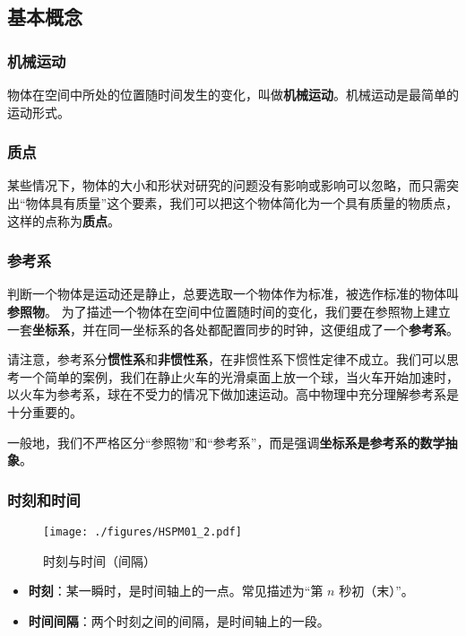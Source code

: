 

\subsection{基本概念}

\subsubsection{机械运动}
物体在空间中所处的位置随时间发生的变化，叫做\textbf{机械运动}。机械运动是最简单的运动形式。

\subsubsection{质点}
某些情况下，物体的大小和形状对研究的问题没有影响或影响可以忽略，而只需突出“物体具有质量”这个要素，我们可以把这个物体简化为一个具有质量的物质点，这样的点称为\textbf{质点}。

\subsubsection{参考系}
判断一个物体是运动还是静止，总要选取一个物体作为标准，被选作标准的物体叫\textbf{参照物}。
为了描述一个物体在空间中位置随时间的变化，我们要在参照物上建立一套\textbf{坐标系}，并在同一坐标系的各处都配置同步的时钟，这便组成了一个\textbf{参考系}。

请注意，参考系分\textbf{惯性系}和\textbf{非惯性系}，在非惯性系下惯性定律不成立。我们可以思考一个简单的案例，我们在静止火车的光滑桌面上放一个球，当火车开始加速时，以火车为参考系，球在不受力的情况下做加速运动。高中物理中充分理解参考系是十分重要的。

一般地，我们不严格区分“参照物”和“参考系”，而是强调\textbf{坐标系是参考系的数学抽象}。

\subsubsection{时刻和时间}
\begin{figure}[ht]
\centering
\texttt{[image: ./figures/HSPM01\_2.pdf]}
\caption{时刻与时间（间隔）} \label{HSPM01_fig2}
\end{figure}
\begin{itemize}
\item \textbf{时刻}：某一瞬时，是时间轴上的一点。常见描述为“第 $n$ 秒初（末）”。
\item \textbf{时间间隔}：两个时刻之间的间隔，是时间轴上的一段。
\end{itemize}

